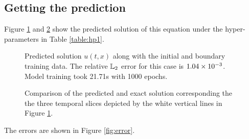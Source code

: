 \documentclass[10pt, a4paper]{article}
\begin{document}
\subsection{Getting the prediction}

Figure \ref{fig:solwithpts} and \ref{fig:slice} show the predicted solution of this equation under the hyper-parameters in Table \ref{table:hp1}.


\begin{figure}[htb]
    \caption{Predicted solution $u(t,x)$ along with the initial and boundary training data. The relative $\mathbb{L}_2 $ error for this case is $1.04\times 10^{-3}$. Model training took 21.71s with 1000 epochs.}
    \label{fig:solwithpts}
\end{figure}

\clearpage

\begin{figure}[tbh]
\caption{Comparison of the predicted and exact solution corresponding the the three temporal slices depicted by the white vertical lines in Figure \ref{fig:solwithpts}.}
\label{fig:slice}
\end{figure}

The errors are shown in Figure \ref{fig:error}.
\end{document}
